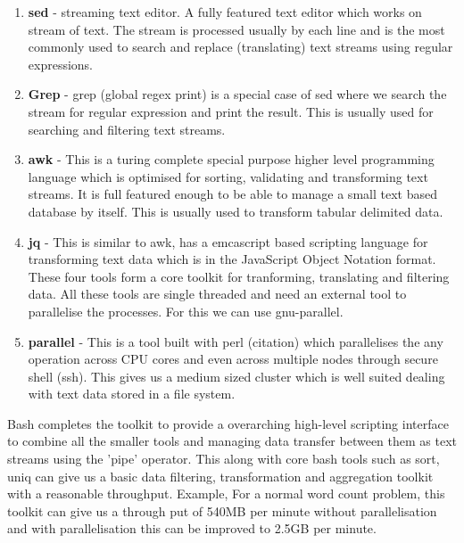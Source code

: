 \begin{enumerate}

\item \textbf{sed} - streaming text editor. A fully featured text editor which works on  stream of text. The stream is processed usually by each line and is the most  commonly used to search and replace (translating) text streams using regular  expressions.

\item \textbf{Grep} - grep (global regex print) is a special case of sed where we search  the stream for regular expression and print the result. This is usually used  for searching and filtering text streams.

\item \textbf{awk} - This is a turing complete special purpose higher level programming  language which is optimised for sorting, validating and transforming text  streams. It is full featured enough to be able to manage a small text based  database by itself. This is usually used to transform tabular delimited data.

\item \textbf{jq} - This is similar to awk, has a emcascript based scripting language  for transforming text data which is in the JavaScript Object Notation format. These four tools form a core toolkit for tranforming, translating and  filtering data. All these tools are single threaded and need an external tool  to parallelise the processes. For this we can use gnu-parallel.

\item \textbf{parallel} - This is a tool built with perl (citation) which parallelises  the any operation across CPU cores and even across multiple nodes through  secure shell (ssh). This gives us a medium sized cluster which is well suited  dealing with text data stored in a file system.

\end{enumerate}

Bash completes the toolkit to provide a overarching high-level scripting interface to combine all the smaller tools and managing data transfer between them as text streams using the 'pipe' operator.
This along with core bash tools such as sort, uniq can give us a basic data filtering, transformation and aggregation toolkit with a reasonable throughput.
Example, For a normal word count problem, this toolkit can give us a through put of 540MB per minute without parallelisation and with parallelisation this can be improved to 2.5GB per minute.


